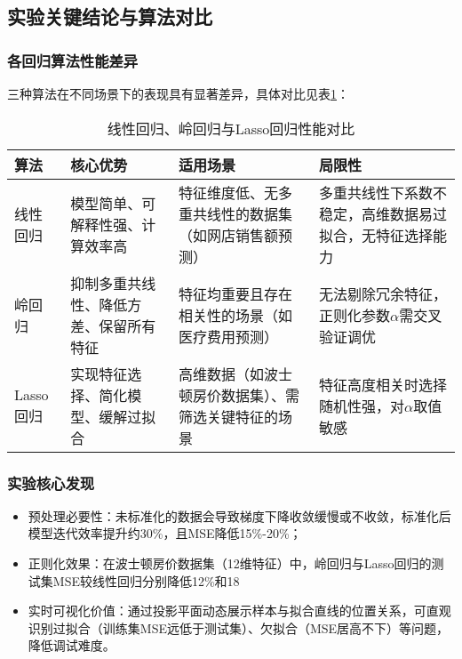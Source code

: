 \subsection{实验关键结论与算法对比}
\subsubsection{各回归算法性能差异}
三种算法在不同场景下的表现具有显著差异，具体对比见表\ref{tab:regression_comparison}：

\begin{table}[!hpt]
  \caption{线性回归、岭回归与Lasso回归性能对比}
  \label{tab:regression_comparison}
  \centering
  \small
  \begin{tabular}{@{}p{}p{}p{}p{}@{}} \toprule
    \textbf{算法} & \textbf{核心优势} & \textbf{适用场景} & \textbf{局限性} \\ \midrule
    线性回归 & 模型简单、可解释性强、计算效率高 & 特征维度低、无多重共线性的数据集（如网店销售额预测） & 多重共线性下系数不稳定，高维数据易过拟合，无特征选择能力 \\
    岭回归 & 抑制多重共线性、降低方差、保留所有特征 & 特征均重要且存在相关性的场景（如医疗费用预测） & 无法剔除冗余特征，正则化参数$\alpha$需交叉验证调优 \\
    Lasso回归 & 实现特征选择、简化模型、缓解过拟合 & 高维数据（如波士顿房价数据集）、需筛选关键特征的场景 & 特征高度相关时选择随机性强，对$\alpha$取值敏感 \\ \bottomrule
  \end{tabular}
\end{table}

\subsubsection{实验核心发现}
\begin{itemize}
    \item {预处理必要性}：未标准化的数据会导致梯度下降收敛缓慢或不收敛，标准化后模型迭代效率提升约30\%，且MSE降低15\%-20\%；
    \item {正则化效果}：在波士顿房价数据集（12维特征）中，岭回归与Lasso回归的测试集MSE较线性回归分别降低12\%和18%
    \item {实时可视化价值}：通过投影平面动态展示样本与拟合直线的位置关系，可直观识别过拟合（训练集MSE远低于测试集）、欠拟合（MSE居高不下）等问题，降低调试难度。
\end{itemize}

